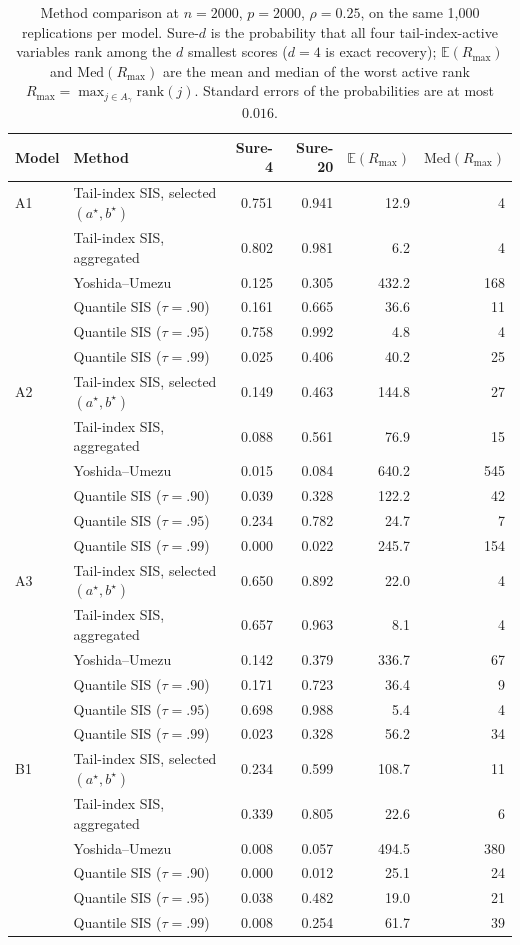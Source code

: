 \documentclass[bj,authoryear]{imsart}
\theoremstyle{plain}
\newcommand{\A}{A}\newcommand{\I}{I_\varepsilon}
\begin{document}
\begin{table}[t]
\centering
\caption{Method comparison at $n=2000$, $p=2000$, $\rho=0.25$, on the same 1{,}000 replications per model. Sure-$d$ is the probability that all four tail-index-active variables rank among the $d$ smallest scores ($d=4$ is exact recovery); $\mathbb{E}(R_{\max})$ and $\mathrm{Med}(R_{\max})$ are the mean and median of the worst active rank $R_{\max}=\max_{j\in\A_\gamma}\mathrm{rank}(j)$. Standard errors of the probabilities are at most $0.016$.}
\label{tab:cmp2000}
\begin{tabular}{llrrrr}
\toprule
Model & Method & Sure-4 & Sure-20 & $\mathbb{E}(R_{\max})$ & $\mathrm{Med}(R_{\max})$\\
\midrule
A1 & Tail-index SIS, selected $(a^\star,b^\star)$ & 0.751 & 0.941 & 12.9 & 4\\
 & Tail-index SIS, aggregated & 0.802 & 0.981 & 6.2 & 4\\
 & Yoshida--Umezu & 0.125 & 0.305 & 432.2 & 168\\
 & Quantile SIS ($\tau=.90$) & 0.161 & 0.665 & 36.6 & 11\\
 & Quantile SIS ($\tau=.95$) & 0.758 & 0.992 & 4.8 & 4\\
 & Quantile SIS ($\tau=.99$) & 0.025 & 0.406 & 40.2 & 25\\
\addlinespace
A2 & Tail-index SIS, selected $(a^\star,b^\star)$ & 0.149 & 0.463 & 144.8 & 27\\
 & Tail-index SIS, aggregated & 0.088 & 0.561 & 76.9 & 15\\
 & Yoshida--Umezu & 0.015 & 0.084 & 640.2 & 545\\
 & Quantile SIS ($\tau=.90$) & 0.039 & 0.328 & 122.2 & 42\\
 & Quantile SIS ($\tau=.95$) & 0.234 & 0.782 & 24.7 & 7\\
 & Quantile SIS ($\tau=.99$) & 0.000 & 0.022 & 245.7 & 154\\
\addlinespace
A3 & Tail-index SIS, selected $(a^\star,b^\star)$ & 0.650 & 0.892 & 22.0 & 4\\
 & Tail-index SIS, aggregated & 0.657 & 0.963 & 8.1 & 4\\
 & Yoshida--Umezu & 0.142 & 0.379 & 336.7 & 67\\
 & Quantile SIS ($\tau=.90$) & 0.171 & 0.723 & 36.4 & 9\\
 & Quantile SIS ($\tau=.95$) & 0.698 & 0.988 & 5.4 & 4\\
 & Quantile SIS ($\tau=.99$) & 0.023 & 0.328 & 56.2 & 34\\
\addlinespace
B1 & Tail-index SIS, selected $(a^\star,b^\star)$ & 0.234 & 0.599 & 108.7 & 11\\
 & Tail-index SIS, aggregated & 0.339 & 0.805 & 22.6 & 6\\
 & Yoshida--Umezu & 0.008 & 0.057 & 494.5 & 380\\
 & Quantile SIS ($\tau=.90$) & 0.000 & 0.012 & 25.1 & 24\\
 & Quantile SIS ($\tau=.95$) & 0.038 & 0.482 & 19.0 & 21\\
 & Quantile SIS ($\tau=.99$) & 0.008 & 0.254 & 61.7 & 39\\
\bottomrule
\end{tabular}
\end{table}
\end{document}
